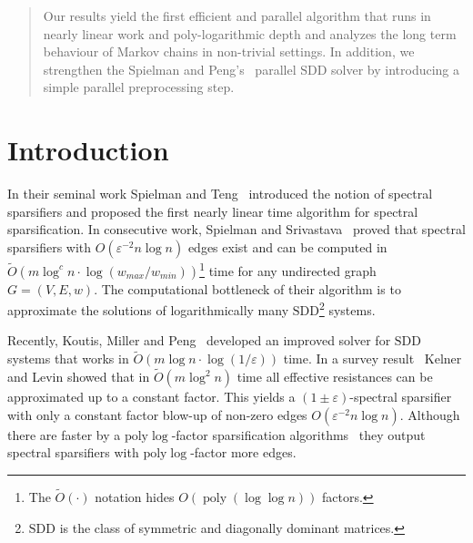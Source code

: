 \documentclass[11pt]{article}
\newcommand{\SDD}{\mathrm{SDD}}
\newcommand{\wO}{\widetilde{O}}
\newcommand{\poly}{\operatorname{poly}}
\newcommand{\eps}{\epsilon}
\renewcommand{\eps}{\varepsilon}
\numberwithin{thm}{section}
\begin{document}
\begin{abstract}
Our results yield the first efficient and parallel algorithm that runs in nearly linear work and poly-logarithmic depth and analyzes the long term behaviour of Markov chains in non-trivial settings. In addition, we strengthen the Spielman and Peng's~\cite{PS14} parallel $\SDD$ solver by introducing a simple parallel preprocessing step.
\end{abstract}


\thispagestyle{empty}

\setcounter{page}{0}

\newpage
\tableofcontents
\newpage



\section{Introduction\label{sec:Intro}}

In their seminal work Spielman and Teng~\cite{ST14} introduced the
notion of spectral sparsifiers and proposed the first nearly linear
time algorithm for spectral sparsification. In consecutive work, Spielman
and Srivastava~\cite{SS08} proved that spectral sparsifiers with
$O(\eps^{-2}n\log n)$ edges exist and can be computed
in $\wO(m\log^{c}n\cdot\log (w_{max}/w_{min}))$\footnote{The $\wO(\cdot)$ notation hides $O(\poly(\log\log n))$ factors.} time for any undirected graph $G=(V,E,w)$. The computational bottleneck of their algorithm is to approximate
the solutions of logarithmically many $\SDD$\footnote{$\SDD$ is the class of symmetric and diagonally dominant matrices.} systems.

Recently, Koutis, Miller and Peng~\cite{KMP11} developed
an improved solver for $\SDD$ systems that works in $\wO(m\log n\cdot\log (1/\eps))$
time. In a survey result~\cite[Theorem 3]{KL13} Kelner and Levin showed that in $\wO(m\log^{2}n)$ time all effective resistances can be approximated up to a constant factor. This yields a $(1\pm\eps)$-spectral sparsifier with only a constant factor blow-up of non-zero edges $O(\eps^{-2}n\log n)$. Although there are faster by a $\mathrm{poly}\log$-factor sparsification algorithms~\cite{KLP12} they output spectral sparsifiers with $\mathrm{poly}\log$-factor more edges.
\end{document}
